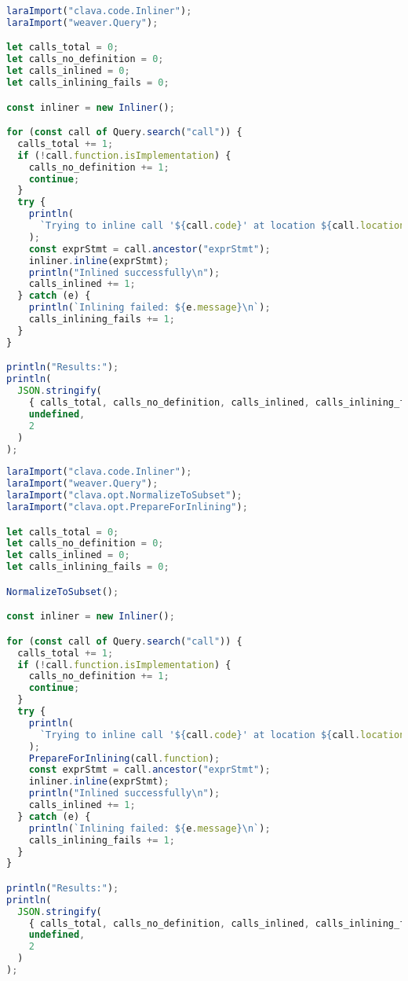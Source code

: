 \begin{lstlisting}[language=js,caption=Newly developed inlining with no normalization]
laraImport("clava.code.Inliner");
laraImport("weaver.Query");

let calls_total = 0;
let calls_no_definition = 0;
let calls_inlined = 0;
let calls_inlining_fails = 0;

const inliner = new Inliner();

for (const call of Query.search("call")) {
  calls_total += 1;
  if (!call.function.isImplementation) {
    calls_no_definition += 1;
    continue;
  }
  try {
    println(
      `Trying to inline call '${call.code}' at location ${call.location}`
    );
    const exprStmt = call.ancestor("exprStmt");
    inliner.inline(exprStmt);
    println("Inlined successfully\n");
    calls_inlined += 1;
  } catch (e) {
    println(`Inlining failed: ${e.message}\n`);
    calls_inlining_fails += 1;
  }
}

println("Results:");
println(
  JSON.stringify(
    { calls_total, calls_no_definition, calls_inlined, calls_inlining_fails },
    undefined,
    2
  )
);
\end{lstlisting}

\begin{lstlisting}[language=js,caption=Newly developed inlining with normalization]
laraImport("clava.code.Inliner");
laraImport("weaver.Query");
laraImport("clava.opt.NormalizeToSubset");
laraImport("clava.opt.PrepareForInlining");

let calls_total = 0;
let calls_no_definition = 0;
let calls_inlined = 0;
let calls_inlining_fails = 0;

NormalizeToSubset();

const inliner = new Inliner();

for (const call of Query.search("call")) {
  calls_total += 1;
  if (!call.function.isImplementation) {
    calls_no_definition += 1;
    continue;
  }
  try {
    println(
      `Trying to inline call '${call.code}' at location ${call.location}`
    );
    PrepareForInlining(call.function);
    const exprStmt = call.ancestor("exprStmt");
    inliner.inline(exprStmt);
    println("Inlined successfully\n");
    calls_inlined += 1;
  } catch (e) {
    println(`Inlining failed: ${e.message}\n`);
    calls_inlining_fails += 1;
  }
}

println("Results:");
println(
  JSON.stringify(
    { calls_total, calls_no_definition, calls_inlined, calls_inlining_fails },
    undefined,
    2
  )
);
\end{lstlisting}